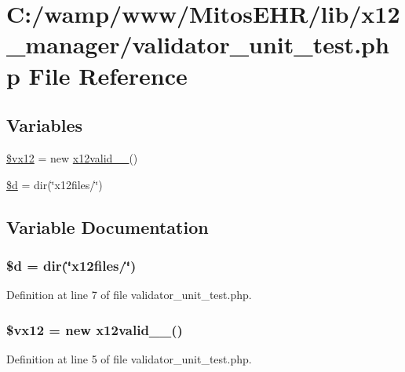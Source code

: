 \hypertarget{validator__unit__test_8php}{\section{\-C\-:/wamp/www/\-Mitos\-E\-H\-R/lib/x12\-\_\-manager/validator\-\_\-unit\-\_\-test.php \-File \-Reference}
\label{validator__unit__test_8php}
}
\subsection*{\-Variables}
\begin{DoxyCompactItemize}
\item 
\hyperlink{validator__unit__test_8php_a58edce330f12eb9ca3236c741d52b111}{\$vx12} = new \hyperlink{classx12valid__837__4010}{x12valid\-\_\-\_}()
\item 
\hyperlink{validator__unit__test_8php_a0cf5dd496d9f5ff1edf00d234771dcfe}{\$d} = dir(\char`\"{}x12files/\char`\"{})
\end{DoxyCompactItemize}


\subsection{\-Variable \-Documentation}
\hypertarget{validator__unit__test_8php_a0cf5dd496d9f5ff1edf00d234771dcfe}{
\subsubsection[{\$d}]{\setlength{\rightskip}{0pt plus 5cm}\$d = dir(\char`\"{}x12files/\char`\"{})}}\label{validator__unit__test_8php_a0cf5dd496d9f5ff1edf00d234771dcfe}


\-Definition at line 7 of file validator\-\_\-unit\-\_\-test.\-php.

\hypertarget{validator__unit__test_8php_a58edce330f12eb9ca3236c741d52b111}{
\subsubsection[{\$vx12}]{\setlength{\rightskip}{0pt plus 5cm}\$vx12 = new {\bf x12valid\-\_\-\_}()}}\label{validator__unit__test_8php_a58edce330f12eb9ca3236c741d52b111}


\-Definition at line 5 of file validator\-\_\-unit\-\_\-test.\-php.

